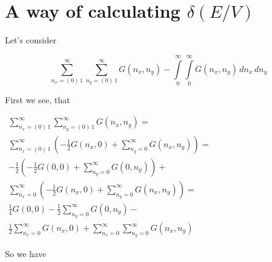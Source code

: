 \documentclass[twoside, 10pt]{article}
\begin{document}
\begin{multicols}{2}
\begin{center}
\begin{tabular}{ | l | }
\hline

\end{tabular}
\end{center}


    \section*{\centering\texorpdfstring{A way of calculating
\(\delta\left(E/V\right)\)}{A way of calculating \textbackslash{}delta\textbackslash{}left(E/V\textbackslash{}right)}}\label{a-way-of-calculating-deltaleftevright}
\vspace{-3.5mm}


    Let's consider

\[
\sum\limits_{n_x=\left(0\right)\,1}^{\infty}
\sum\limits_{n_y=\left(0\right)\,1}^{\infty}
G\left(n_x, n_y\right)
-
\int\limits_{0}^{\infty}
\int\limits_{0}^{\infty}
G\left(n_x, n_y\right)\,d{n_x}\,d{n_y}
\]

    First we see, that

$\begin{array}{c}
    \sum\limits_{n_x=\left(0\right)\,1}^{\infty} \sum\limits_{n_y=\left(0\right)\,1}^{\infty} {G\left(n_x, n_y\right)} = \\
 \sum\limits_{n_x=\left(0\right)\,1}^{\infty} \left( -\frac{1}{2}G\left(n_x, 0\right) + \sum\limits_{n_y=0}^{\infty}{G\left(n_x, n_y\right)} \right) = \\
 -\frac{1}{2} \left( -\frac{1}{2}G\left(0, 0\right) + \sum\limits_{n_y=0}^{\infty}{G\left(0, n_y\right)} \right) + \\
\sum\limits_{n_x=0}^{\infty} \left( -\frac{1}{2}G\left(n_x, 0\right) + \sum\limits_{n_y=0}^{\infty}{G\left(n_x, n_y\right)} \right) = \\
 \frac{1}{4}G\left(0, 0\right) - \frac{1}{2}\sum\limits_{n_y=0}^{\infty}{G\left(0, n_y\right)} - \\
\frac{1}{2}\sum\limits_{n_x=0}^{\infty}{G\left(n_x, 0\right)} + \sum\limits_{n_x=0}^{\infty}\sum\limits_{n_y=0}^{\infty}{G\left(n_x, n_y\right)}
\end{array}$

    So we have


\end{multicols}
\end{document}
